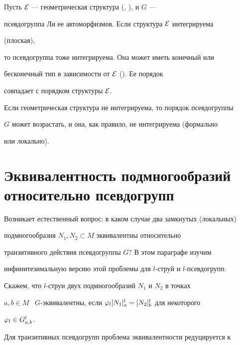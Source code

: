 \begin{exam}


Пусть ${\cal E}$ --- геометрическая структура (\cite{Gu}, \cite{Ly}), и $G$ ---


псевдогруппа Ли ее автоморфизмов. Если структура ${\cal E}$ интегрируема


(плоская),


то псевдогруппа тоже интегрируема. Она может иметь конечный или


бесконечный тип в зависимости от ${\cal E}$ (\cite{Ko}). Ее порядок


совпадает с порядком структуры ${\cal E}$.


Если геометрическая структура не интегрируема, то порядок псевдогруппы


$G$ может возрастать, и она, как правило, не интегрируема (формально


или локально).


\end{exam}








\section{Эквивалентность подмногообразий относительно псевдогрупп}





Возникает естественный вопрос: в каком случае два замкнутых (локальных)


подмногообразия $N_1,N_2\subset M$ эквивалентны относительно


транзитивного действия псевдогруппы $G$? В этом параграфе изучим


инфинитезимальную версию этой проблемы для $l$-струй и $l$-псевдогрупп.





\begin{defn}


Скажем, что $l$-струи двух подмногообразий $N_1$ и $N_2$ в точках


$a,b\in M$ \ $G$-эквивалентны, если $\varphi_l[N_1]^l_a=[N_2]^l_b$ для некоторого


$\varphi_l\in G^l_{a,b}$.


\end{defn}





Для транзитивных псевдогрупп проблема эквивалентности редуцируется к



